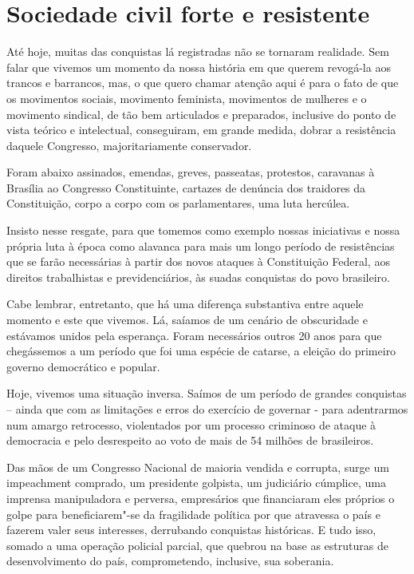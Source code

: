 \section{Sociedade civil forte e resistente}

Até hoje, muitas das conquistas lá registradas não se tornaram
realidade. Sem falar que vivemos um momento da nossa história em que
querem revogá-la aos trancos e barrancos, mas, o que quero chamar
atenção aqui é para o fato de que os movimentos sociais, movimento
feminista, movimentos de mulheres e o movimento sindical, de tão bem
articulados e preparados, inclusive do ponto de vista teórico e
intelectual, conseguiram, em grande medida, dobrar a resistência daquele
Congresso, majoritariamente conservador.

Foram abaixo assinados, emendas, greves, passeatas, protestos, caravanas
à Brasília ao Congresso Constituinte, cartazes de denúncia dos traidores
da Constituição, corpo a corpo com os parlamentares, uma luta hercúlea.

Insisto nesse resgate, para que tomemos como exemplo nossas iniciativas
e nossa própria luta à época como alavanca para mais um longo período de
resistências que se farão necessárias à partir dos novos ataques à
Constituição Federal, aos direitos trabalhistas e previdenciários, às
suadas conquistas do povo brasileiro.

Cabe lembrar, entretanto, que há uma diferença substantiva entre aquele
momento e este que vivemos. Lá, saíamos de um cenário de obscuridade e
estávamos unidos pela esperança. Foram necessários outros 20 anos para
que chegássemos a um período que foi uma espécie de catarse, a eleição
do primeiro governo democrático e popular.

Hoje, vivemos uma situação inversa. Saímos de um período de grandes
conquistas -- ainda que com as limitações e erros do exercício de
governar - para adentrarmos num amargo retrocesso, violentados por um
processo criminoso de ataque à democracia e pelo desrespeito ao voto de
mais de 54 milhões de brasileiros.

Das mãos de um Congresso Nacional de maioria vendida e corrupta, surge
um impeachment comprado, um presidente golpista, um judiciário cúmplice,
uma imprensa manipuladora e perversa, empresários que financiaram eles
próprios o golpe para beneficiarem"-se da fragilidade política por que
atravessa o país e fazerem valer seus interesses, derrubando conquistas
históricas. E tudo isso, somado a uma operação policial parcial, que
quebrou na base as estruturas de desenvolvimento do país, comprometendo,
inclusive, sua soberania.

